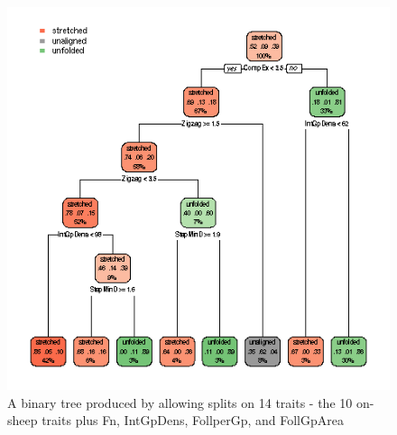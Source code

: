 %

\begin{figure}[!h]
  \centering
  \includegraphics[width=1.1\textwidth]{figrpart14.png}
  \caption{A binary tree produced by allowing splits on 14 traits - the 10 on-sheep traits plus Fn, IntGpDens, FollperGp, and FollGpArea}
  \label{fig:rpart14}
\end{figure}

%

